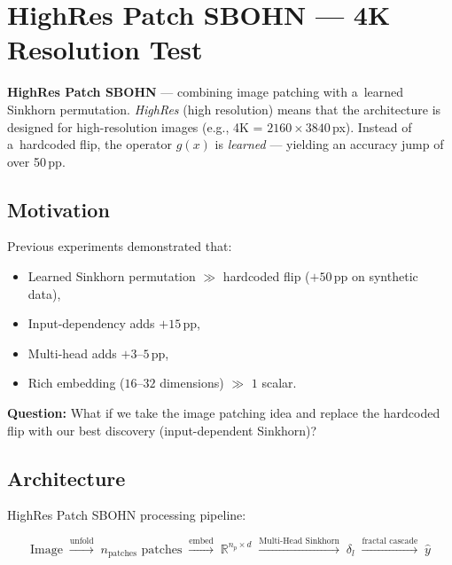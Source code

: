 \documentclass[11pt,a4paper]{report}
\begin{document}



\section{HighRes Patch SBOHN --- 4K Resolution Test}\label{sec:highres_patch}

\begin{tcolorbox}[title=Name: HighRes Patch SBOHN,breakable]
\textbf{HighRes Patch SBOHN} --- combining image patching with a~learned Sinkhorn permutation.
\emph{HighRes} (high resolution) means that the architecture is
designed for high-resolution images (e.g., 4K = $2160 \times 3840$\,px).
Instead of a~hardcoded flip, the operator $g(x)$ is \emph{learned} --- yielding an accuracy jump of over 50\,pp.
\end{tcolorbox}

\subsection{Motivation}

Previous experiments demonstrated that:
\begin{itemize}
\item Learned Sinkhorn permutation $\gg$ hardcoded flip ($+50$\,pp on synthetic data),
\item Input-dependency adds $+15$\,pp,
\item Multi-head adds $+3$--$5$\,pp,
\item Rich embedding ($16$--$32$ dimensions) $\gg$ $1$ scalar.
\end{itemize}

\textbf{Question:} What if we take the image patching idea and replace the hardcoded flip with our
best discovery (input-dependent Sinkhorn)?

\subsection{Architecture}

HighRes Patch SBOHN processing pipeline:

\[
\text{Image}
\;\xrightarrow{\text{unfold}}\;
n_{\text{patches}} \text{ patches}
\;\xrightarrow{\text{embed}}\;
\mathbb{R}^{n_p \times d}
\;\xrightarrow{\text{Multi-Head Sinkhorn}}\;
\delta_l
\;\xrightarrow{\text{fractal cascade}}\;
\hat{y}
\]
\end{document}
